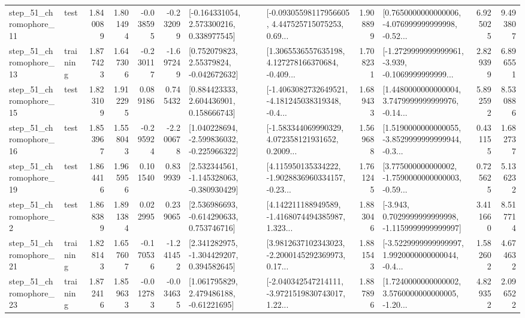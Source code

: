 \begin{tabular}{llrrrrllrlrr}
   step\_51\_chromophore\_11 &      test &      1.840089 &    1.801494 &     -0.038595 & -0.232099 &    [-0.164331054, 2.573300216, 0.338977545] &  [-0.09305598117956605, 4.447525715075253, 0.69... &       1.908899 &  [0.7650000000000006, -4.076999999999998, -0.52... &            6.925025 &          9.493807 \\
   step\_51\_chromophore\_13 &  training &      1.877423 &    1.647306 &     -0.230117 & -1.697249 &     [0.752079823, 2.55379824, -0.042672632] &  [1.3065536557635198, 4.127278166370684, -0.409... &       1.708231 &  [-1.2729999999999961, -3.939, -0.1069999999999... &            2.829399 &          6.896551 \\
   step\_51\_chromophore\_15 &      test &      1.823109 &    1.912295 &      0.089186 &  0.745432 &     [0.884423333, 2.604436901, 0.158666743] &  [-1.4063082732649521, -4.181245038319348, -0.4... &       1.689433 &  [1.4480000000000004, 3.7479999999999976, -0.14... &            5.892592 &          8.530886 \\
   step\_51\_chromophore\_16 &      test &      1.853967 &    1.558043 &     -0.295924 & -2.200678 &   [1.040228694, -2.599836032, -0.225966322] &  [-1.583344069990329, 4.072358121931652, 0.2009... &       1.569688 &  [1.5190000000000055, -3.8529999999999944, -0.3... &            0.431155 &          1.682737 \\
   step\_51\_chromophore\_19 &      test &      1.864416 &    1.965956 &      0.101540 &  0.839939 &   [2.532344561, -1.145328063, -0.380930429] &  [4.115950135334222, -1.9028836960334157, -0.23... &       1.761245 &  [3.775000000000002, -1.7590000000000003, -0.59... &            0.725625 &          5.136232 \\
    step\_51\_chromophore\_2 &      test &      1.868389 &    1.891384 &      0.022995 &  0.239065 &    [2.536986693, -0.614290633, 0.753746716] &  [4.142211188949589, -1.4168074494385987, 1.323... &       1.883046 &  [-3.943, 0.7029999999999998, -1.1159999999999997] &            3.411660 &          8.517714 \\
   step\_51\_chromophore\_21 &  training &      1.828143 &    1.657607 &     -0.170536 & -1.241452 &    [2.341282975, -1.304429207, 0.394582645] &  [3.9812637102343023, -2.2000145292369973, 0.17... &       1.881543 &  [-3.5229999999999997, 1.9920000000000044, -0.4... &            1.582602 &          4.674632 \\
   step\_51\_chromophore\_23 &  training &      1.872416 &    1.859633 &     -0.012783 & -0.034635 &     [1.061795829, 2.479486188, -0.61221695] &  [-2.040342547214111, -3.9721519830743017, 1.22... &       1.887896 &  [1.7240000000000002, 3.5760000000000005, -1.20... &            4.829352 &          2.096522 \\

\end{tabular}
